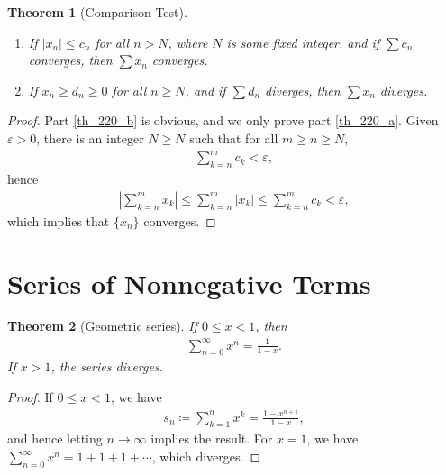 \documentclass[11pt]{book}
\newtheorem{theorem}{Theorem}[chapter]
\theoremstyle{definition}
\numberwithin{equation}{chapter}
\begin{document}
\begin{theorem}[Comparison Test]\label{th_220}
~\begin{enumerate}[label=(\alph*)]
    \item If $\left|x_n\right| \leq c_n$ for all $n > N$, where $N$ is some fixed integer, and if $\sum c_n$ converges, then $\sum x_n$ converges. \label{th_220_a}
    
    \item If $x_n \geq d_n \geq 0$ for all $n \geq N$, and if $\sum d_n$ diverges, then $\sum x_n$ diverges. \label{th_220_b}
\end{enumerate}
\end{theorem}
\begin{proof}
Part \ref{th_220_b} is obvious, and we only prove part \ref{th_220_a}. Given $\varepsilon > 0$, there is an integer $\widetilde{N} \geq N$ such that for all $m \geq n \geq \widetilde{N}$, 
\begin{align*}
    \sum^m_{k=n} c_k < \varepsilon,
\end{align*}
hence
\begin{align*}
    \left|\sum^m_{k=n} x_k\right| \leq \sum^m_{k=n} \left|x_k\right| \leq \sum^m_{k=n} c_k < \varepsilon,
\end{align*}
which implies that $\{x_n\}$ converges.
\end{proof}

\medskip



\section{Series of Nonnegative Terms}

\begin{theorem}[Geometric series]\label{th_221}
If $0 \leq x < 1$, then
\begin{align*}
    \sum^\infty_{n=0} x^n = \frac{1}{1 - x}.
\end{align*}
If $x > 1$, the series diverges.
\end{theorem}
\begin{proof}
If $0 \leq x < 1$, we have
\begin{align*}
    s_n \coloneqq \sum^n_{k=1} x^k = \frac{1 - x^{n+1}}{1 - x},
\end{align*}
and hence letting $n \to \infty$ implies the result. For $x = 1$, we have $\sum^\infty_{n=0} x^n = 1 + 1 + 1 + \cdots$, which diverges. 
\end{proof}

\medskip
\end{document}
